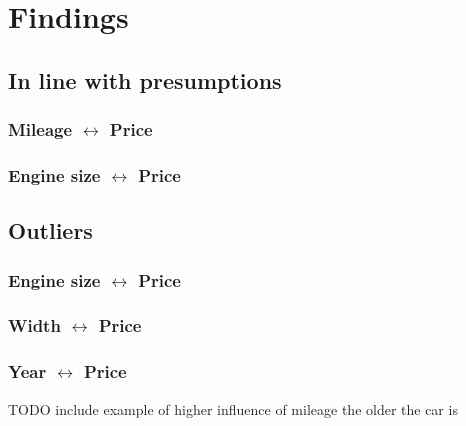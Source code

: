 \section{Findings}
\subsection{In line with presumptions}
\subsubsection{Mileage $\leftrightarrow$ Price}
\subsubsection{Engine size $\leftrightarrow$ Price}

\subsection{Outliers}
\subsubsection{Engine size $\leftrightarrow$ Price}
\subsubsection{Width $\leftrightarrow$ Price}
\subsubsection{Year $\leftrightarrow$ Price}
TODO include example of higher influence of mileage the older the car is
